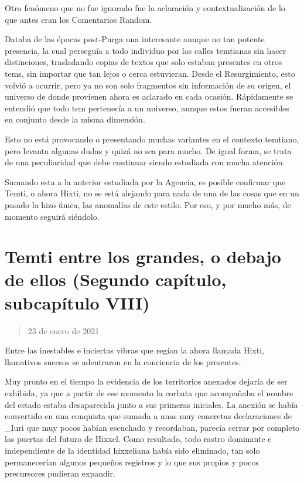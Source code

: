 \documentclass[
  spanish,
]{book}
\begin{document}
Otro fenómeno que no fue ignorado fue la aclaración y contextualización de lo que antes eran los Comentarios Random.

Databa de las épocas post-Purga una interesante aunque no tan potente presencia, la cual perseguía a todo individuo por las calles temtianas sin hacer distinciones, trasladando copias de textos que solo estaban presentes en otros tems, sin importar que tan lejos o cerca estuvieran. Desde el Resurgimiento, esto volvió a ocurrir, pero ya no son solo fragmentos sin información de su origen, el universo de donde provienen ahora es aclarado en cada ocasión. Rápidamente se entendió que todo tem pertenecía a un universo, aunque estos fueran accesibles en conjunto desde la misma dimensión.

Esto no está provocando o presentando muchas variantes en el contexto temtiano, pero levanta algunas dudas y quizá no sea para mucho. De igual forma, se trata de una peculiaridad que debe continuar siendo estudiada con mucha atención.

Sumando esta a la anterior estudiada por la Agencia, es posible confirmar que Temti, o ahora Hixti, no se está alejando para nada de una de las cosas que en un pasado la hizo única, las anomalías de este estilo. Por eso, y por mucho más, de momento seguirá siéndolo.

\hypertarget{temti-entre-los-grandes-o-debajo-de-ellos-segundo-capuxedtulo-subcapuxedtulo-viii}{%
\section{Temti entre los grandes, o debajo de ellos (Segundo capítulo, subcapítulo VIII)}\label{temti-entre-los-grandes-o-debajo-de-ellos-segundo-capuxedtulo-subcapuxedtulo-viii}}

\begin{quote}
23 de enero de 2021
\end{quote}

Entre las inestables e inciertas vibras que regían la ahora llamada Hixti, llamativos sucesos se adentraron en la conciencia de los presentes.

Muy pronto en el tiempo la evidencia de los territorios anexados dejaría de ser exhibida, ya que a partir de ese momento la corbata que acompañaba el nombre del estado estaba desaparecida junto a sus primeras iniciales.
La anexión se había convertido en una conquista que sumada a unas muy concretas declaraciones de \_Iuri que muy pocos habían escuchado y recordaban, parecía cerrar por completo las puertas del futuro de Hixxel. Como resultado, todo rastro dominante e independiente de la identidad hixxeliana había sido eliminado, tan solo permanecerían algunos pequeños registros y lo que sus propios y pocos precursores pudieran expandir.
\end{document}
